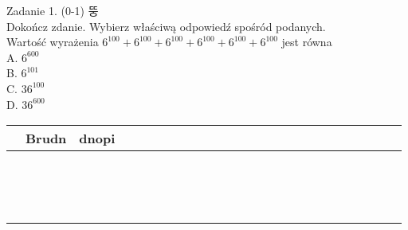 \documentclass[10pt]{article}
\begin{document}
Zadanie 1. (0-1) 뚱\\
Dokończ zdanie. Wybierz właściwą odpowiedź spośród podanych.\\
Wartość wyrażenia \(6^{100}+6^{100}+6^{100}+6^{100}+6^{100}+6^{100}\) jest równa\\
A. \(6^{600}\)\\
B. \(6^{101}\)\\
C. \(36^{100}\)\\
D. \(36^{600}\)

\begin{center}
\begin{tabular}{|c|c|c|c|c|c|c|c|c|c|c|c|c|c|c|c|c|c|c|c|c|c|c|c|c|}
\hline
 & Brudn & dnopi &  &  &  &  &  &  &  &  &  &  &  &  &  &  &  &  &  &  &  &  &  &  \\
\hline
 &  &  &  &  &  &  &  &  &  &  &  &  &  &  &  &  &  &  &  &  &  &  &  &  \\
\hline
 &  &  &  &  &  &  &  &  &  &  &  &  &  &  &  &  &  &  &  &  &  &  &  &  \\
\hline
 &  &  &  &  &  &  &  &  &  &  &  &  &  &  &  &  &  &  &  &  &  &  &  &  \\
\hline
 &  &  &  &  &  &  &  &  &  &  &  &  &  &  &  &  &  &  &  &  &  &  &  &  \\
\hline
 &  &  &  &  &  &  &  &  &  &  &  &  &  &  &  &  &  &  &  &  &  &  &  &  \\
\hline
 &  &  &  &  &  &  &  &  &  &  &  &  &  &  &  &  &  &  &  &  &  &  &  &  \\
\hline
 &  &  &  &  &  &  &  &  &  &  &  &  &  &  &  &  &  &  &  &  &  &  &  &  \\
\hline
 &  &  &  &  &  &  &  &  &  &  &  &  &  &  &  &  &  &  &  &  &  &  &  &  \\
\hline
 &  &  &  &  &  &  &  &  &  &  &  &  &  &  &  &  &  &  &  &  &  &  &  &  \\
\hline
 &  &  &  &  &  &  &  &  &  &  &  &  &  &  &  &  &  &  &  &  &  &  &  &  \\
\hline
 &  &  &  &  &  &  &  &  &  &  &  &  &  &  &  &  &  &  &  &  &  &  &  &  \\
\hline
 &  &  &  &  &  &  &  &  &  &  &  &  &  &  &  &  &  &  &  &  &  &  &  &  \\
\hline
 &  &  &  &  &  &  &  &  &  &  &  &  &  &  &  &  &  &  &  &  &  &  &  &  \\
\hline
 &  &  &  &  &  &  &  &  &  &  &  &  &  &  &  &  &  &  &  &  &  &  &  &  \\
\hline
 &  &  &  &  &  &  &  &  &  &  &  &  &  &  &  &  &  &  &  &  &  &  &  &  \\
\hline
\end{tabular}
\end{center}
\end{document}
